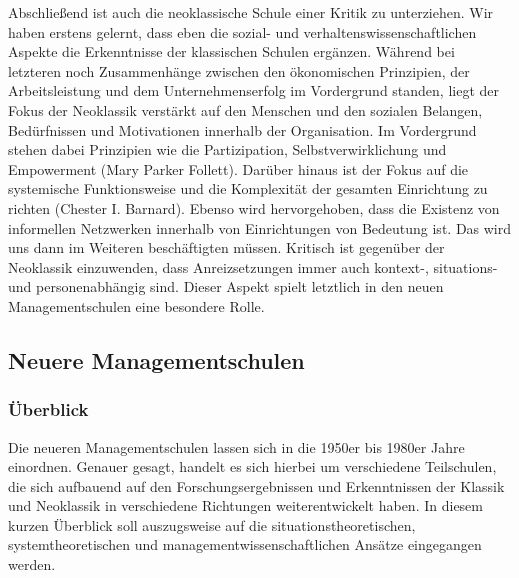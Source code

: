 \documentclass[
  letterpaper,
]{book}
\begin{document}
Abschließend ist auch die neoklassische Schule einer Kritik zu
unterziehen. Wir haben erstens gelernt, dass eben die sozial- und
verhaltenswissenschaftlichen Aspekte die Erkenntnisse der klassischen
Schulen ergänzen. Während bei letzteren noch Zusammenhänge zwischen den
ökonomischen Prinzipien, der Arbeitsleistung und dem Unternehmenserfolg
im Vordergrund standen, liegt der Fokus der Neoklassik verstärkt auf den
Menschen und den sozialen Belangen, Bedürfnissen und Motivationen
innerhalb der Organisation. Im Vordergrund stehen dabei Prinzipien wie
die Partizipation, Selbstverwirklichung und Empowerment (Mary Parker
Follett). Darüber hinaus ist der Fokus auf die systemische
Funktionsweise und die Komplexität der gesamten Einrichtung zu richten
(Chester I. Barnard). Ebenso wird hervorgehoben, dass die Existenz von
informellen Netzwerken innerhalb von Einrichtungen von Bedeutung ist.
Das wird uns dann im Weiteren beschäftigten müssen. Kritisch ist
gegenüber der Neoklassik einzuwenden, dass Anreizsetzungen immer auch
kontext-, situations- und personenabhängig sind. Dieser Aspekt spielt
letztlich in den neuen Managementschulen eine besondere Rolle.

\subsection{Neuere Managementschulen}\label{neuere-managementschulen}

\subsubsection{Überblick}\label{uxfcberblick-2}

Die neueren Managementschulen lassen sich in die 1950er bis 1980er Jahre
einordnen. Genauer gesagt, handelt es sich hierbei um verschiedene
Teilschulen, die sich aufbauend auf den Forschungsergebnissen und
Erkenntnissen der Klassik und Neoklassik in verschiedene Richtungen
weiterentwickelt haben. In diesem kurzen Überblick soll auszugsweise auf
die situationstheoretischen, systemtheoretischen und
managementwissenschaftlichen Ansätze eingegangen werden.
\end{document}

